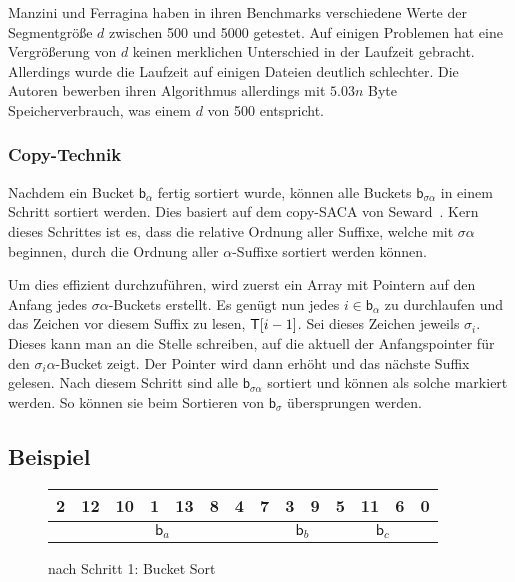 Manzini und Ferragina haben in ihren Benchmarks verschiedene Werte der Segmentgröße $d$ zwischen 500 und 5000 getestet.
Auf einigen Problemen hat eine Vergrößerung von $d$ keinen merklichen Unterschied in der Laufzeit gebracht.
Allerdings wurde die Laufzeit auf einigen Dateien deutlich schlechter.
Die Autoren bewerben ihren Algorithmus allerdings mit $5.03n$ Byte Speicherverbrauch, was einem $d$ von 500 entspricht.

\subsubsection{Copy-Technik}
\label{ds:copy}

Nachdem ein Bucket $\mathsf{b}_\alpha$ fertig sortiert wurde, können alle Buckets $\mathsf{b}_{\sigma\alpha}$ in einem Schritt sortiert werden.
Dies basiert auf dem copy-SACA von Seward~\cite{seward2000}.
Kern dieses Schrittes ist es, dass die relative Ordnung aller Suffixe,
welche mit $\sigma\alpha$ beginnen, durch die Ordnung aller $\alpha$-Suffixe sortiert werden können.

Um dies effizient durchzuführen, wird zuerst ein Array mit Pointern auf
den Anfang jedes $\sigma\alpha$-Buckets erstellt.
Es genügt nun jedes $i \in \mathsf{b}_\alpha$ zu durchlaufen und das Zeichen
vor diesem Suffix zu lesen, $\inputtext[i - 1]$.
Sei dieses Zeichen jeweils $\sigma_i$.
Dieses kann man an die Stelle schreiben, auf die aktuell der Anfangspointer für den $\sigma_i\alpha$-Bucket zeigt.
Der Pointer wird dann erhöht und das nächste Suffix gelesen.
Nach diesem Schritt sind alle $\mathsf{b}_{\sigma\alpha}$ sortiert und können als solche markiert werden.
So können sie beim Sortieren von $\mathsf{b}_\sigma$ übersprungen werden.

\subsection{Beispiel}

\begin{figure}[!h]
\centering
\begin{tabular}{|c|c|c|c|c|c|c|c|c|c|c|c|c|c|}
\hline
2 & 12 & 10 & 1 & 13 & 8 & 4 & 7 & 3 & 9 & 5 & 11 & 6 & 0 \\
\hline
\multicolumn{8}{|c|}{$\mathsf{b}_a$} & \multicolumn{2}{c|}{$\mathsf{b}_b$} & \multicolumn{4}{c|}{$\mathsf{b}_c$} \\
\hline
\end{tabular}
\caption{\sa nach Schritt 1: Bucket Sort}
\label{ds:beispiel1}
\end{figure}

